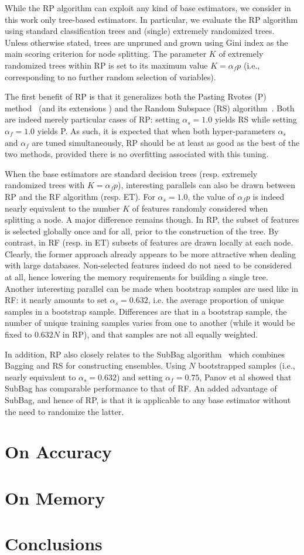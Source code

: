 While the RP algorithm can exploit any kind of base estimators, we consider in
this work only tree-based estimators. In particular, we evaluate the RP
algorithm using  standard classification trees and (single) extremely randomized
trees. Unless otherwise stated, trees are unpruned and grown using Gini index
as the main scoring criterion for node splitting. The parameter $K$ of
extremely randomized trees within RP is set to its maximum value $K=\alpha_f p$
(i.e., corresponding to no further random selection of variables).

The first benefit of RP is that it generalizes both the Pasting Rvotes (P)
method~\citep{breiman:1999} (and its extensions \citep{chawla:2004,basilico:2011})
and the Random Subspace (RS) algorithm~\citep{ho:1998}. Both are indeed merely
particular cases of RP: setting $\alpha_s=1.0$ yields RS while setting
$\alpha_f=1.0$ yields P. As such, it is expected that when both
hyper-parameters $\alpha_s$ and $\alpha_f$ are tuned simultaneously, RP should be at
least as good as the best of the two methods, provided there is no overfitting
associated with this tuning.

When the base estimators are standard decision trees (resp. extremely
randomized trees with $K=\alpha_f p$), interesting parallels can also be
drawn between RP and the RF algorithm (resp. ET). For $\alpha_s=1.0$, the
value of $\alpha_f p$ is indeed nearly equivalent to the number $K$ of
features randomly considered when splitting a node. A major difference
remains though. In RP, the subset of features is selected globally
once and for all, prior to the construction of the tree. By contrast,
in RF (resp. in ET) subsets of features are drawn locally at each
node. Clearly, the former approach already appears to be more
attractive when dealing with large databases. Non-selected features
indeed do not need to be considered at all, hence lowering the memory
requirements for building a single tree. Another interesting parallel
can be made when bootstrap samples are used like in RF: it nearly
amounts to set $\alpha_s=0.632$, i.e. the average proportion of unique
samples in a bootstrap sample. Differences are that in a bootstrap
sample, the number of unique training samples varies from one to
another (while it would be fixed to $0.632 N$ in RP), and that
samples are not all equally weighted.

In addition, RP also closely relates to the SubBag algorithm~\citep{panov:2007}
which combines Bagging and RS for constructing ensembles. Using $N$
bootstrapped samples (i.e., nearly equivalent to $\alpha_s=0.632$) and setting
$\alpha_f=0.75$, Panov et al showed that SubBag has comparable performance to that of
RF. An added advantage of SubBag, and hence of RP, is that it is applicable to
any base estimator without the need to randomize the latter.


\section{On Accuracy}
\label{sec:9:accuracy}

\section{On Memory}
\label{sec:9:memory}

\section{Conclusions}
\label{sec:9:conclusions}
